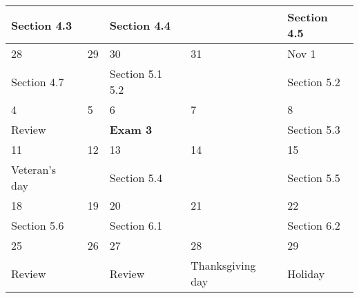 \documentclass[12pt]{amsart}
\begin{document}
\begin {enumerate}
\begin{center}
\begin{tabular}{ |m{7em}|m{5em}|m{7em}|m{5em}|m{7em}|}
 Section 4.3 &  &Section 4.4 &  &  Section 4.5\\
\hline 
\multicolumn {1}{|l|}{28} & \multicolumn {1}{l|}{29} & \multicolumn {1}{l|}{30}  & \multicolumn {1}{l|}{31} &\multicolumn {1}{l|}{Nov 1}  \\
Section 4.7 & &Section 5.1 5.2  &  & Section 5.2  \\
\hline
\multicolumn {1}{|l|}{4} & \multicolumn {1}{l|}{5} & \multicolumn {1}{l|}{6}  & \multicolumn {1}{l|}{7} &\multicolumn {1}{l|}{8}  \\
Review& & {\bf Exam 3}&  & Section 5.3 \\
\hline
\multicolumn {1}{|l|}{11} & \multicolumn {1}{l|}{12} & \multicolumn {1}{l|}{13}  & \multicolumn {1}{l|}{14} &\multicolumn {1}{l|}{15}  \\
Veteran's day & & Section 5.4 & & Section 5.5 \\
\hline
\multicolumn {1}{|l|}{18} & \multicolumn {1}{l|}{19} & \multicolumn {1}{l|}{20}  & \multicolumn {1}{l|}{21} &\multicolumn {1}{l|}{22}  \\
Section 5.6&  &Section 6.1 &  & Section 6.2 \\
\hline
\multicolumn {1}{|l|}{25} & \multicolumn {1}{l|}{26} & \multicolumn {1}{l|}{27}  & \multicolumn {1}{l|}{28} &\multicolumn {1}{l|}{29}  \\
Review &  &Review &  Thanksgiving day & Holiday  \\
\hline


\end{tabular}
\end{center}


\end {enumerate}



\end{document}
